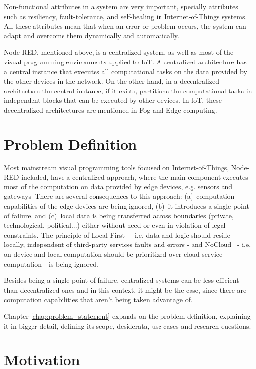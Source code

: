 Non-functional attributes in a system are very important, specially attributes such as resiliency, fault-tolerance, and self-healing in Internet-of-Things systems. All these attributes mean that when an error or problem occurs, the system can adapt and overcome them dynamically and automatically.

Node-RED, mentioned above, is a centralized system, as well as most of the visual programming environments applied to IoT. A centralized architecture has a central instance that executes all computational tasks on the data provided by the other devices in the network. On the other hand, in a decentralized architecture the central instance, if it exists, partitions the computational tasks in independent blocks that can be executed by other devices. In IoT, these decentralized architectures are mentioned in Fog and Edge computing.

\section{Problem Definition} \label{sec:problem_definition}

Most mainstream visual programming tools focused on Internet-of-Things, Node-RED included, have a centralized approach, where the main component executes most of the computation on data provided by edge devices, e.g. sensors and gateways. There are several consequences to this approach: (a)~computation capabilities of the edge devices are being ignored, (b)~it introduces a single point of failure, and (c)~local data is being transferred across boundaries (private, technological, political...) either without need or even in violation of legal constraints. The principle of Local-First~\cite{localfist} - i.e, data and logic should reside locally, independent of third-party services faults and errors - and NoCloud~\cite{nocloud} - i.e, on-device and local computation should be prioritized over cloud service computation - is being ignored. 

Besides being a single point of failure, centralized systems can be less efficient than decentralized ones and in this context, it might be the case, since there are computation capabilities that aren't being taken advantage of.

Chapter \ref{chap:problem_statement} expands on the problem definition, explaining it in bigger detail, defining its scope, desiderata, use cases and research questions.

\section{Motivation} \label{sec:motivation}

